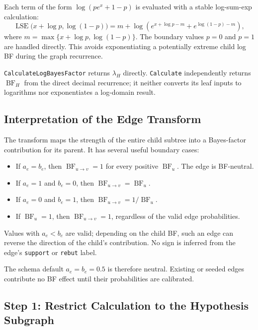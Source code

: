 \documentclass[11pt]{article}
\newcommand{\BF}{\operatorname{BF}}
\begin{document}
Each term of the form
\(\log(p e^x+1-p)\) is evaluated with a stable log-sum-exp calculation:
\[
    \operatorname{LSE}\bigl(x+\log p,\log(1-p)\bigr)
      =m+\log\!\left(e^{x+\log p-m}+e^{\log(1-p)-m}\right),
\]
where
\(m=\max\{x+\log p,\log(1-p)\}\).  The boundary values \(p=0\) and
\(p=1\) are handled directly.  This avoids exponentiating a potentially
extreme child log BF during the graph recurrence.

\texttt{CalculateLogBayesFactor} returns \(\lambda_H\) directly.
\texttt{Calculate} independently returns \(\BF_H\) from the direct decimal
recurrence; it neither converts its leaf inputs to logarithms nor exponentiates
a log-domain result.

\subsection{Interpretation of the Edge Transform}

The transform maps the strength of the entire child subtree into a Bayes-factor
contribution for its parent.  It has several useful boundary cases:

\begin{itemize}
    \item If \(a_e=b_e\), then \(\BF_{u\rightarrow v}=1\) for every positive
          \(\BF_u\).  The edge is BF-neutral.
    \item If \(a_e=1\) and \(b_e=0\), then
          \(\BF_{u\rightarrow v}=\BF_u\).
    \item If \(a_e=0\) and \(b_e=1\), then
          \(\BF_{u\rightarrow v}=1/\BF_u\).
    \item If \(\BF_u=1\), then \(\BF_{u\rightarrow v}=1\), regardless of
          the valid edge probabilities.
\end{itemize}

Values with \(a_e<b_e\) are valid; depending on the child BF, such an edge can
reverse the direction of the child's contribution.  No sign is inferred from
the edge's \texttt{support} or \texttt{rebut} label.

The schema default \(a_e=b_e=0.5\) is therefore neutral.  Existing or seeded
edges contribute no BF effect until their probabilities are calibrated.

\subsection{Step 1: Restrict Calculation to the Hypothesis Subgraph}
\end{document}
